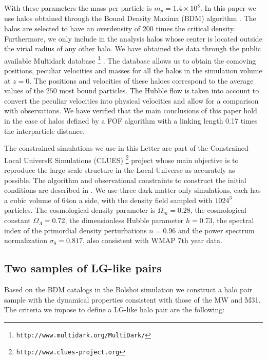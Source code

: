 \documentclass{emulateapj}
\newcommand{\hMpc}{{\ifmmode{h^{-1}{\rm Mpc}}\else{$h^{-1}$Mpc }\fi}}
\newcommand{\hMsun}{{\ifmmode{h^{-1}{\rm {M_{\odot}}}}\else{$h^{-1}{\rm{M_{\odot}}}$}\fi}}
\begin{document}
With these parameters the mass per particle is $m_{p}=1.4\times
10^{8}$\hMsun. In this paper we use halos obtained through the
Bound Density Maxima (BDM) algorithm \citep{KlypinBDM}. The halos are
selected to have an overdensity of 200 times the critical
density. Furthermore, we only include in the analysis halos whose
center is located outside the virial radius of any other halo.  We
have obtained the data through the public available Multidark
database \footnote{{\tt http://www.multidark.org/MultiDark/}}
\citep{2011arXiv1109.0003R}. The database allows us to obtain the
comoving positions, peculiar velocities and masses for all the halos
in the simulation volume at $z=0$. The positions and velocities of
these haloes correspond to the average values of the $250$ most bound
particles. The Hubble flow is taken into account to convert the
peculiar velocities into physical velocities and allow for a
comparison with observations. We have verified that the main
conclusions of this paper hold in the case of halos defined by a FOF
algorithm with a linking length 0.17 times the interparticle
distance. 

The constrained simulations we use in this Letter are part of the
Constrained Local UniversE Simulations (CLUES)  \footnote{{\tt http://www.clues-project.org}} project whose main
objective is to reproduce the large scale structure in the Local
Universe as accurately as possible. The algorithm and observational
constraints to construct the initial conditions are  described in
\cite{clues2010}.  We use three dark matter only simulations, each
has a cubic volume of $64$\hMpc on a side, with the density field
sampled with $1024^3$ particles. The cosmological density parameter is
$\Omega_m=0.28$, the cosmological constant $\Omega_{\Lambda}=0.72$,
the dimensionless Hubble parameter $h=0.73$, the spectral index of the
primordial density perturbations $n=0.96$ and the power spectrum
normalization $\sigma_{8}=0.817$, also consistent with WMAP 7th year
data.  


\subsection{Two samples of LG-like pairs}
Based on the BDM catalogs in the Bolshoi simulation we construct a
halo pair sample with the dynamical  properties consistent with  those
of  the MW and M31. The  criteria  we impose to define a LG-like halo
pair are the following: 
\end{document}
